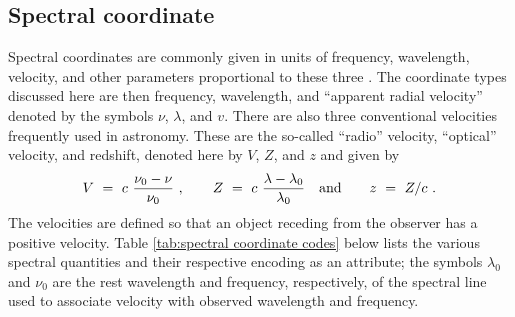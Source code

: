\documentclass[a4paper,10pt,bibtotoc]{scrreprt}
\begin{document}

\subsection{Spectral coordinate}
\label{sec:coord-spectral}

Spectral coordinates are commonly given in units of frequency,
wavelength, velocity, and other parameters proportional to these
three \cite{fits.paper3}. The coordinate types discussed here are then frequency,
wavelength, and “apparent radial velocity” denoted by the symbols
$\nu$, $\lambda$, and $v$. There are also three conventional
velocities frequently used in astronomy. These are the so-called
“radio” velocity, “optical” velocity, and redshift, denoted here by
$V$, $Z$, and $z$ and given by
\begin{displaymath}
  V \ = \ c \ \frac{\nu_{0} - \nu}{\nu_{0}} \ , \qquad
  Z \ = \ c \ \frac{\lambda-\lambda_0}{\lambda_0} \quad \hbox{and} \qquad
  z \ = \ Z/c \ .
\end{displaymath}
The velocities are defined so that an object receding from the observer has a
positive velocity. Table \ref{tab:spectral coordinate codes} below
lists the various spectral quantities and their respective encoding as
an attribute; the symbols $\lambda_{0}$ and $\nu_{0}$ are the rest
wavelength and frequency, respectively, of the spectral line used to
associate velocity with observed wavelength and frequency.
\end{document}

